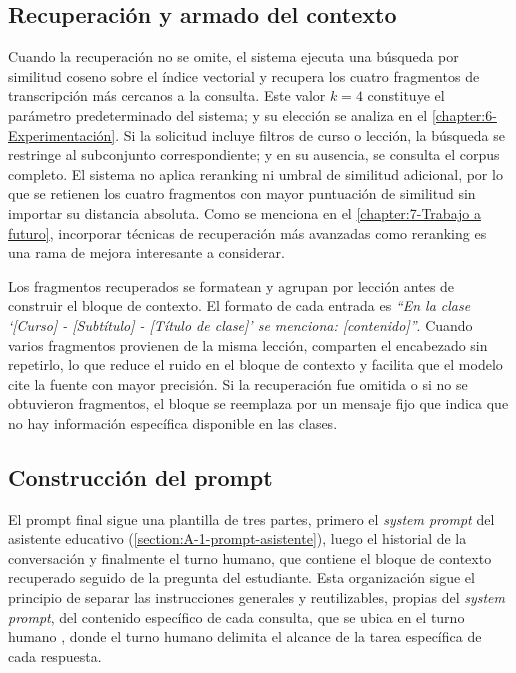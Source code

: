 \subsection{Recuperación y armado del contexto}
\label{subsection:4-Recuperacion}

Cuando la recuperación no se omite, el sistema ejecuta una búsqueda por similitud coseno sobre el índice vectorial y recupera los cuatro fragmentos de transcripción más cercanos a la consulta. Este valor $k = 4$ constituye el parámetro predeterminado del sistema; y su elección se analiza en el \autoref{chapter:6-Experimentación}. Si la solicitud incluye filtros de curso o lección, la búsqueda se restringe al subconjunto correspondiente; y en su ausencia, se consulta el corpus completo. El sistema no aplica reranking ni umbral de similitud adicional, por lo que se retienen los cuatro fragmentos con mayor puntuación de similitud sin importar su distancia absoluta. Como se menciona en el \autoref{chapter:7-Trabajo a futuro}, incorporar técnicas de recuperación más avanzadas como reranking es una rama de mejora interesante a considerar.

Los fragmentos recuperados se formatean y agrupan por lección antes de construir el bloque de contexto. El formato de cada entrada es \textit{``En la clase `[Curso] - [Subtítulo] - [Título de clase]' se menciona: [contenido]''}. Cuando varios fragmentos provienen de la misma lección, comparten el encabezado sin repetirlo, lo que reduce el ruido en el bloque de contexto y facilita que el modelo cite la fuente con mayor precisión. Si la recuperación fue omitida o si no se obtuvieron fragmentos, el bloque se reemplaza por un mensaje fijo que indica que no hay información específica disponible en las clases.

\subsection{Construcción del prompt}
\label{subsection:4-Construccion-Prompt}

El prompt final sigue una plantilla de tres partes, primero el \textit{system prompt} del asistente educativo (\autoref{section:A-1-prompt-asistente}), luego el historial de la conversación y finalmente el turno humano, que contiene el bloque de contexto recuperado seguido de la pregunta del estudiante. Esta organización sigue el principio de separar las instrucciones generales y reutilizables, propias del \textit{system prompt}, del contenido específico de cada consulta, que se ubica en el turno humano \cite{openai_prompt_guide}, donde el turno humano delimita el alcance de la tarea específica de cada respuesta.

